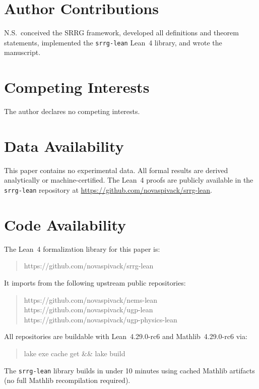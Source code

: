 \documentclass[11pt]{article}
\theoremstyle{remark}
\begin{document}
\section*{Author Contributions}
N.S.\ conceived the SRRG framework, developed all definitions and theorem
statements, implemented the \texttt{srrg-lean} Lean~4 library, and wrote
the manuscript.

\section*{Competing Interests}
The author declares no competing interests.

\section*{Data Availability}
This paper contains no experimental data. All formal results are derived
analytically or machine-certified. The Lean~4 proofs are publicly available
in the \texttt{srrg-lean} repository at
\url{https://github.com/novaspivack/srrg-lean}.

\section*{Code Availability}
The Lean~4 formalization library for this paper is:
\begin{quote}
\small\ttfamily
https://github.com/novaspivack/srrg-lean
\end{quote}
It imports from the following upstream public repositories:
\begin{quote}
\small\ttfamily
https://github.com/novaspivack/nems-lean\\
https://github.com/novaspivack/ugp-lean\\
https://github.com/novaspivack/ugp-physics-lean
\end{quote}
All repositories are buildable with Lean~4.29.0-rc6 and Mathlib~4.29.0-rc6 via:
\begin{quote}
\small\ttfamily
lake exe cache get \&\& lake build
\end{quote}
The \texttt{srrg-lean} library builds in under 10 minutes using cached Mathlib
artifacts (no full Mathlib recompilation required).



\end{document}
